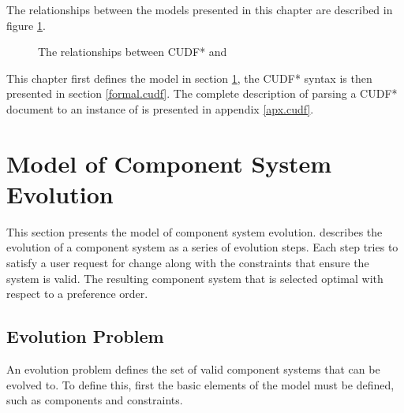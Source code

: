 The relationships between the models presented in this chapter are described in figure \ref{formal.modeldiagram}.
\begin{figure}[htp]
\begin{center}
  \caption{The relationships between CUDF* and \modelname}
  \label{formal.modeldiagram}
\end{center}
\end{figure}

This chapter first 
defines the \modelname model in section \ref{formal.step},
the CUDF* syntax is then presented in section \ref{formal.cudf}.
The complete description of parsing a CUDF* document to an instance of \modelname is presented in appendix \ref{apx.cudf}.
 
\section{\modelname Model of Component System Evolution}
\label{formal.step}
This section presents the \modelname model of component system evolution. 
\modelname describes the evolution of a component system as a series of evolution steps.
Each step tries to satisfy a user request for change along with the constraints that ensure the system is valid.
The resulting component system that is selected optimal with respect to a preference order.


\subsection{Evolution Problem}
An evolution problem defines the set of valid component systems that can be evolved to.
To define this, first the basic elements of the model must be defined, such as components and constraints. 

